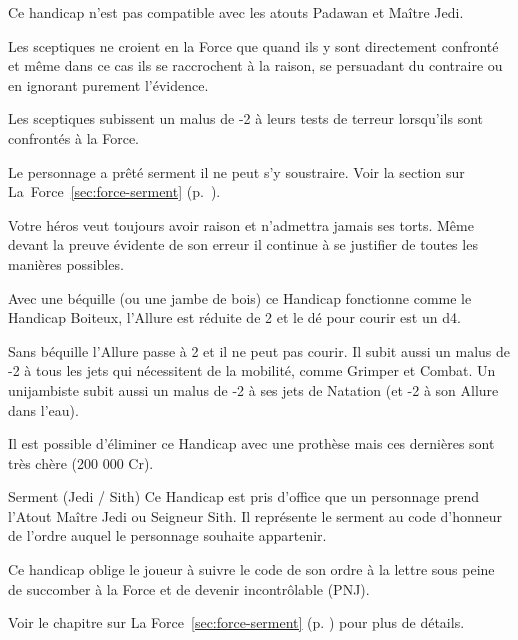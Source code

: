 \begin{description}[align=left]
        Ce handicap n’est pas compatible avec les atouts Padawan et Maître Jedi.

    \item [Sceptique (Mineur)]
        Les sceptiques ne croient en la Force que quand ils y sont directement confronté et même dans ce cas ils se raccrochent à la raison, se persuadant du contraire ou en ignorant purement l’évidence.

        Les sceptiques subissent un malus de -2 à leurs tests de terreur lorsqu’ils sont confrontés à la Force.

    \item [Serment (Jedi ou Sith) (Majeur)]
        Le personnage a prêté serment il ne peut s’y soustraire. Voir la section sur La~Force~\ref{sec:force-serment} (p.~\pageref{sec:force-serment}).

    \item [Têtu (Mineur)]
        Votre héros veut toujours avoir raison et n’admettra jamais ses torts. Même devant la preuve évidente de son erreur il continue à se justifier de toutes les manières possibles.

    \item [Unijambiste (Majeur)]
        Avec une béquille (ou une jambe de bois) ce Handicap fonctionne comme le Handicap Boiteux, l’Allure est réduite de 2 et le dé pour courir est un d4.

        Sans béquille l’Allure passe à 2 et il ne peut pas courir. Il subit aussi un malus de -2 à tous les jets qui nécessitent de la mobilité, comme Grimper et Combat. Un unijambiste subit aussi un malus de -2 à ses jets de Natation (et -2 à son Allure dans l’eau).

        Il est possible d’éliminer ce Handicap avec une prothèse mais ces dernières sont très chère (200 000 Cr).

\end{description}

\begin{paperbox}{Serment (Jedi / Sith)}
    Ce Handicap est pris d’office que un personnage prend l’Atout Maître Jedi ou Seigneur Sith. Il représente le serment au code d’honneur de l’ordre auquel le personnage souhaite appartenir.

    Ce handicap oblige le joueur à suivre le code de son ordre à la lettre sous peine de succomber à la Force et de devenir incontrôlable (PNJ).

    Voir le chapitre sur La Force~\ref{sec:force-serment} (p. \pageref{sec:force-serment}) pour plus de détails.
\end{paperbox}

